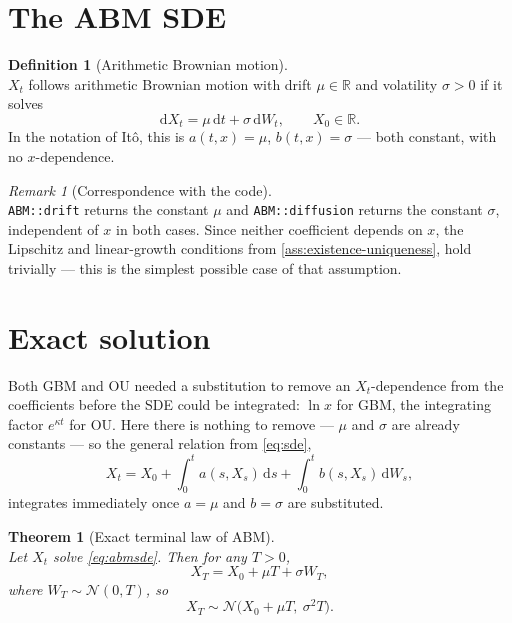 \documentclass[11pt]{report}
\newcommand{\dd}{\mathrm{d}}
\newcommand{\dW}{\dd W_t}
\newcommand{\dt}{\dd t}
\newcommand{\R}{\mathbb{R}}
\newcommand{\drift}{a}
\newcommand{\diff}{b}
\theoremstyle{plain}
\newtheorem{theorem}{Theorem}[chapter]
\theoremstyle{definition}
\newtheorem{definition}{Definition}[chapter]
\theoremstyle{remark}
\newtheorem{remark}{Remark}[chapter]
\numberwithin{equation}{chapter}
\begin{document}
\section{The ABM SDE}

\begin{definition}[Arithmetic Brownian motion]\label{def:abm}
  \leavevmode\\
$X_t$ follows arithmetic Brownian motion with drift $\mu\in\R$ and
volatility $\sigma>0$ if it solves
\begin{equation}\label{eq:abmsde}
   \dd X_t = \mu\,\dt + \sigma\,\dW, \qquad X_0\in\R.
\end{equation}
In the notation of It\^o, this is
$\drift(t,x)=\mu$, $\diff(t,x)=\sigma$ --- both constant, with no
$x$-dependence.
\end{definition}

\begin{remark}[Correspondence with the code]
  \leavevmode\\
\texttt{ABM::drift} returns the constant $\mu$ and
\texttt{ABM::diffusion} returns the constant $\sigma$, independent of
$x$ in both cases. Since neither coefficient depends on $x$, the
Lipschitz and linear-growth conditions from \cref{ass:existence-uniqueness}, hold trivially --- this is
the simplest possible case of that assumption.
\end{remark}

\section{Exact solution}

Both GBM and OU needed a substitution to remove an $X_t$-dependence
from the coefficients before the SDE could be integrated: $\ln x$ for
GBM, the integrating factor $e^{\kappa t}$ for OU. Here there is
nothing to remove --- $\mu$ and $\sigma$ are already constants --- so
the general relation from \eqref{eq:sde},
\[
   X_t = X_0 + \int_0^t \drift(s,X_s)\,\dd s + \int_0^t \diff(s,X_s)\,\dd W_s,
\]
integrates immediately once $\drift=\mu$ and $\diff=\sigma$ are
substituted.

\begin{theorem}[Exact terminal law of ABM]\label{thm:abm-exact}
  \leavevmode\\
Let $X_t$ solve \eqref{eq:abmsde}. Then for any $T>0$,
\begin{equation}\label{eq:abmexact}
   X_T = X_0 + \mu T + \sigma W_T,
\end{equation}
where $W_T\sim\mathcal N(0,T)$, so
\begin{equation}\label{eq:abmlaw}
   X_T \sim \mathcal N\big(X_0+\mu T,\ \sigma^2 T\big).
\end{equation}
\end{theorem}
\end{document}
